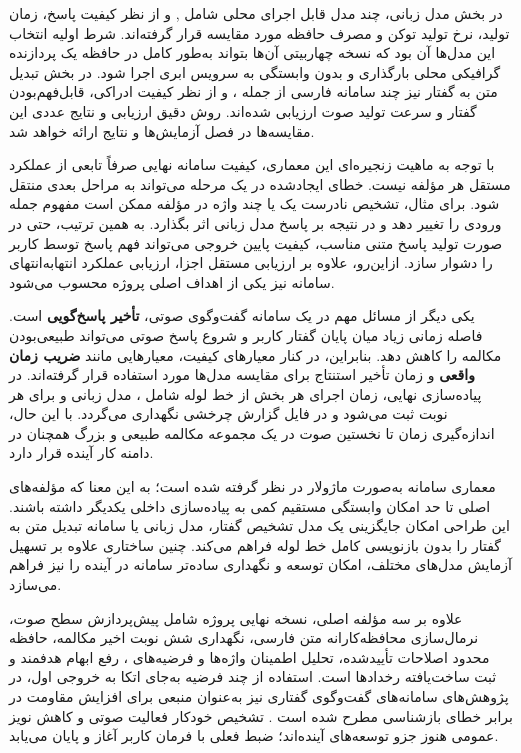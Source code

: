 در بخش مدل زبانی، چند مدل قابل اجرای محلی شامل
,  و 
از نظر کیفیت پاسخ، زمان تولید، نرخ تولید توکن و مصرف حافظه
مورد مقایسه قرار گرفته‌اند.
شرط اولیه انتخاب این مدل‌ها آن بود که نسخه چهاربیتی آن‌ها بتواند
به‌طور کامل در حافظه یک پردازنده گرافیکی محلی بارگذاری و بدون
وابستگی به سرویس ابری اجرا شود.
در بخش تبدیل متن به گفتار نیز چند سامانه فارسی از جمله
،  و 
از نظر کیفیت ادراکی، قابل‌فهم‌بودن گفتار و سرعت تولید صوت
ارزیابی شده‌اند.
روش دقیق ارزیابی و نتایج عددی این مقایسه‌ها در فصل آزمایش‌ها
و نتایج ارائه خواهد شد.

با توجه به ماهیت زنجیره‌ای این معماری، کیفیت سامانه نهایی صرفاً
تابعی از عملکرد مستقل هر مؤلفه نیست.
خطای ایجادشده در یک مرحله می‌تواند به مراحل بعدی منتقل شود.
برای مثال، تشخیص نادرست یک یا چند واژه در مؤلفه 
ممکن است مفهوم جمله ورودی را تغییر دهد و در نتیجه بر پاسخ
مدل زبانی اثر بگذارد.
به همین ترتیب، حتی در صورت تولید پاسخ متنی مناسب، کیفیت پایین
خروجی  می‌تواند فهم پاسخ توسط کاربر را دشوار سازد.
ازاین‌رو، علاوه بر ارزیابی مستقل اجزا، ارزیابی عملکرد
انتهابه‌انتهای سامانه نیز یکی از اهداف اصلی پروژه محسوب می‌شود.

یکی دیگر از مسائل مهم در یک سامانه گفت‌وگوی صوتی،
\textbf{تأخیر پاسخ‌گویی}
است.
فاصله زمانی زیاد میان پایان گفتار کاربر و شروع پاسخ صوتی می‌تواند
طبیعی‌بودن مکالمه را کاهش دهد.
بنابراین، در کنار معیارهای کیفیت، معیارهایی مانند
\textbf{ضریب زمان واقعی}
و زمان تأخیر استنتاج برای مقایسه مدل‌ها مورد استفاده قرار گرفته‌اند.
در پیاده‌سازی نهایی، زمان اجرای هر بخش از خط لوله شامل
، مدل زبانی و 
برای هر نوبت ثبت می‌شود و در فایل گزارش چرخشی نگهداری می‌گردد.
با این حال، اندازه‌گیری زمان تا نخستین صوت در یک مجموعه مکالمه
طبیعی و بزرگ همچنان در دامنه کار آینده قرار دارد.

معماری سامانه به‌صورت ماژولار در نظر گرفته شده است؛
به این معنا که مؤلفه‌های اصلی تا حد امکان وابستگی مستقیم کمی
به پیاده‌سازی داخلی یکدیگر داشته باشند.
این طراحی امکان جایگزینی یک مدل تشخیص گفتار، مدل زبانی
یا سامانه تبدیل متن به گفتار را بدون بازنویسی کامل خط لوله فراهم
می‌کند.
چنین ساختاری علاوه بر تسهیل آزمایش مدل‌های مختلف، امکان توسعه
و نگهداری ساده‌تر سامانه در آینده را نیز فراهم می‌سازد.

علاوه بر سه مؤلفه اصلی، نسخه نهایی پروژه شامل پیش‌پردازش سطح
صوت، نرمال‌سازی محافظه‌کارانه متن فارسی، نگهداری شش نوبت اخیر
مکالمه، حافظه محدود اصلاحات تأییدشده، تحلیل اطمینان واژه‌ها و
فرضیه‌های ، رفع ابهام هدفمند و ثبت ساخت‌یافته رخدادها است.
استفاده از چند فرضیه به‌جای اتکا به خروجی اول، در پژوهش‌های
سامانه‌های گفت‌وگوی گفتاری نیز به‌عنوان منبعی برای افزایش مقاومت
در برابر خطای بازشناسی مطرح شده است \cite{baumann2009nbest,faruqui2022boundary}.
تشخیص خودکار فعالیت صوتی
و کاهش نویز عمومی هنوز جزو توسعه‌های آینده‌اند؛ ضبط فعلی با فرمان
کاربر آغاز و پایان می‌یابد.

